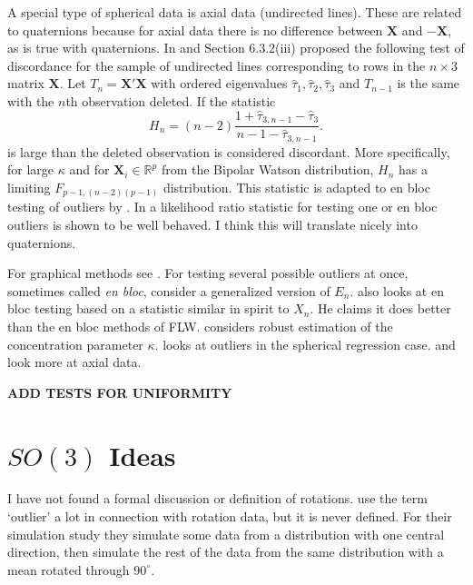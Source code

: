 \documentclass{article}\usepackage[]{graphicx}\usepackage[]{color}
\newcommand{\R}{{\mathbb{R}}}
\begin{document}
A special type of spherical data is axial data (undirected lines).  These are related to quaternions because for axial data there is no difference between $\bm X$ and $-\bm X$, as is true with quaternions.  In \cite{best1986} and Section 6.3.2(iii) \cite{fisher1987} proposed the following test of discordance for the sample of undirected lines corresponding to rows in the $n\times 3$ matrix $\bm X$.  Let $T_n=\bm X'\bm X$ with ordered eigenvalues $\hat\tau_1,\hat\tau_2,\hat\tau_3$ and $T_{n-1}$ is the same with the $n$th observation deleted.  If the statistic
\[
H_n=(n-2)\frac{1+\hat\tau_{3,n-1}-\hat\tau_3}{n-1-\hat\tau_{3,n-1}}.
\]
is large than the deleted observation is considered discordant.  More specifically, for large $\kappa$ and for $\bm X_i\in \R^p$ from the Bipolar Watson distribution, $H_n$ has a limiting $F_{p-1,(n-2)(p-1)}$ distribution.  This statistic is adapted to en bloc testing of outliers by \cite{figueiredo2005}.  In \cite{figueiredo2007} a likelihood ratio statistic for testing one or en bloc outliers is shown to be well behaved.  I think this will translate nicely into quaternions.




For graphical methods see \cite{lewis1982}.  For testing several possible outliers at once, sometimes called {\it en bloc}, \cite{fisher1981} consider a generalized version of $E_n$. \cite{kimber1985} also looks at en bloc testing based on a statistic similar in spirit to $X_n$.  He claims it does better than the en bloc methods of FLW.   \cite{fisher1982} considers robust estimation of the concentration parameter $\kappa$.   \cite{rivest1989} looks at outliers in the spherical regression case.   \cite{best1986} and \cite{fisher1987} look more at axial data.

{\bf ADD TESTS FOR UNIFORMITY}


\section{$SO(3)$ Ideas}

I have not found a formal discussion or definition of rotations. \cite{fletcher2008} use the term `outlier' a lot in connection with rotation data, but it is never defined.  For their simulation study they simulate some data from a distribution with one central direction, then simulate the rest of the data from the same distribution with a mean rotated through $90^\circ$.
\end{document}
